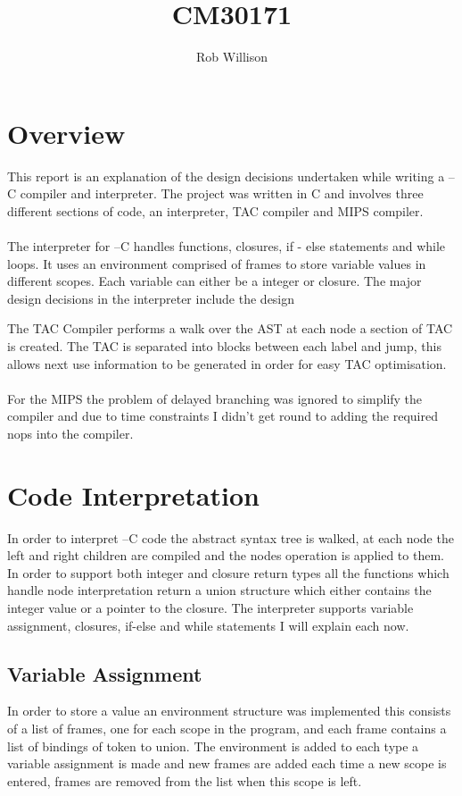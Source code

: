 \documentclass{article}
\begin{document}
\title{CM30171}
\author{Rob Willison}

\maketitle
\tableofcontents

\section{Overview}
This report is an explanation of the design decisions undertaken while writing
a --C compiler and interpreter. The project was written in C and involves three
different sections of code, an interpreter, TAC compiler and MIPS compiler.\\~\\

The interpreter for --C handles functions, closures, if - else statements and while loops.
It uses an environment comprised of frames to store variable values in different scopes. Each
variable can either be a integer or closure. The major design decisions in the interpreter
include the design 

The TAC Compiler performs a walk over the AST at each node a section of TAC is created.
The TAC is separated into blocks between each label and jump, this allows next use
information to be generated in order for easy TAC optimisation.\\~\\
For the MIPS the problem of delayed branching was ignored to simplify the compiler
and due to time constraints I didn't get round to adding the required nops into the
compiler.

\newpage
\section{Code Interpretation}

In order to interpret --C code the abstract syntax tree is walked, at each node
the left and right children are compiled and the nodes operation is applied to them.
In order to support both integer and closure return types all the functions which handle
node interpretation return a union structure which either contains the integer value or
a pointer to the closure. The interpreter supports variable assignment, closures, if-else and while
statements I will explain each now.

\subsection{Variable Assignment}
In order to store a value an environment structure was implemented this consists
of a list of frames, one for each scope in the program, and each frame contains a
list of bindings of token to union. The environment is added to each type a variable
assignment is made and new frames are added each time a new scope is entered, frames are
removed from the list when this scope is left.
\end{document}
